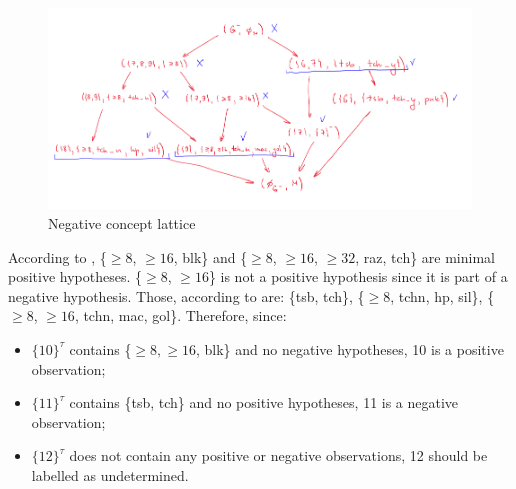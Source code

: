 \documentclass[14pt,a4paper]{extarticle}
\begin{document}
	\begin{figure}[h]
		\includegraphics[scale=.6]{media/task2_2.png}
		\centering
		\caption{Negative concept lattice}
		\label{fig:neg_lat}
	\end{figure}
	
	According to , \{$\geq8$, $\geq16$, blk\} and \{$\geq8$, $\geq16$, $\geq32$, raz, tch\} are minimal positive hypotheses. \{$\geq8$, $\geq16$\} is not a positive hypothesis since it is part of a negative hypothesis. Those, according to  are: \{tsb, tch\}, \{$\geq8$, tch\textunderscore{}n, hp, sil\}, \{$\geq8$, $\geq16$, tch\textunderscore{}n, mac, gol\}. Therefore, since:
	\begin{itemize}
		\item $\{10\}^{\tau}$ contains \{$\geq8, \geq16$, blk\} and no negative hypotheses, 10 is a positive observation;
		\item $\{11\}^{\tau}$ contains \{tsb, tch\} and no positive hypotheses, 11 is a negative observation;
		\item $\{12\}^{\tau}$ does not contain any positive or negative observations, 12 should be labelled as undetermined.
	\end{itemize}
\end{document}
